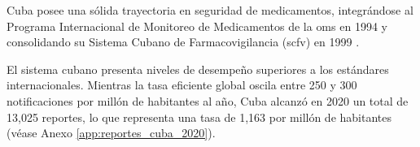 Cuba posee una sólida trayectoria en seguridad de medicamentos, integrándose al Programa Internacional de Monitoreo de Medicamentos de la \gls{oms} en 1994 y consolidando su Sistema Cubano de Farmacovigilancia (\gls{scfv}) en 1999 \cite{paho_vigilancia_medicamentos_cuba, tarrago_farmacovigilancia_cuba_2019}.

El sistema cubano presenta niveles de desempeño superiores a los estándares internacionales. Mientras la tasa eficiente global oscila entre 250 y 300 notificaciones por millón de habitantes al año, Cuba alcanzó en 2020 un total de 13,025 reportes, lo que representa una tasa de 1,163 por millón de habitantes \cite{cecmed_farmacovigilancia_cuba_2020} (véase Anexo \ref{app:reportes_cuba_2020}).






